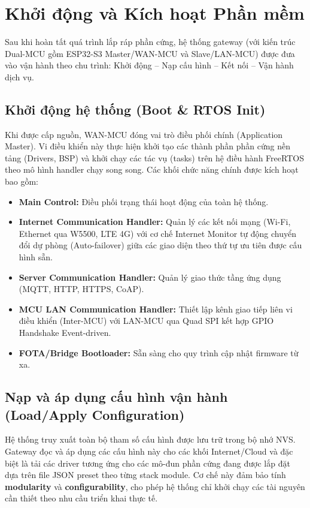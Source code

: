 \section{Khởi động và Kích hoạt Phần mềm}
    Sau khi hoàn tất quá trình lắp ráp phần cứng, hệ thống gateway (với kiến trúc Dual-MCU gồm ESP32-S3 Master/WAN-MCU và Slave/LAN-MCU) được đưa vào vận hành theo chu trình: Khởi động – Nạp cấu hình – Kết nối – Vận hành dịch vụ.

    \subsection{Khởi động hệ thống (Boot \& RTOS Init)}

    Khi được cấp nguồn, WAN-MCU đóng vai trò điều phối chính (Application Master). Vi điều khiển này thực hiện khởi tạo các thành phần phần cứng nền tảng (Drivers, BSP) và khởi chạy các tác vụ (tasks) trên hệ điều hành FreeRTOS theo mô hình handler chạy song song. Các khối chức năng chính được kích hoạt bao gồm:

    \begin{itemize}
        \item \textbf{Main Control:} Điều phối trạng thái hoạt động của toàn hệ thống.
        \item \textbf{Internet Communication Handler:} Quản lý các kết nối mạng (Wi-Fi, Ethernet qua W5500, LTE 4G) với cơ chế Internet Monitor tự động chuyển đổi dự phòng (Auto-failover) giữa các giao diện theo thứ tự ưu tiên được cấu hình sẵn.
        \item \textbf{Server Communication Handler:} Quản lý giao thức tầng ứng dụng (MQTT, HTTP, HTTPS, CoAP).
        \item \textbf{MCU LAN Communication Handler:} Thiết lập kênh giao tiếp liên vi điều khiển (Inter-MCU) với LAN-MCU qua Quad SPI kết hợp GPIO Handshake Event-driven.
        \item \textbf{FOTA/Bridge Bootloader:} Sẵn sàng cho quy trình cập nhật firmware từ xa.
    \end{itemize}

    \subsection{Nạp và áp dụng cấu hình vận hành (Load/Apply Configuration)}

    Hệ thống truy xuất toàn bộ tham số cấu hình được lưu trữ trong bộ nhớ NVS. Gateway đọc và áp dụng các cấu hình này cho các khối Internet/Cloud và đặc biệt là tải các driver tương ứng cho các mô-đun phần cứng đang được lắp đặt dựa trên file JSON preset theo từng stack module. Cơ chế này đảm bảo tính \textbf{modularity} và \textbf{configurability}, cho phép hệ thống chỉ khởi chạy các tài nguyên cần thiết theo nhu cầu triển khai thực tế.

